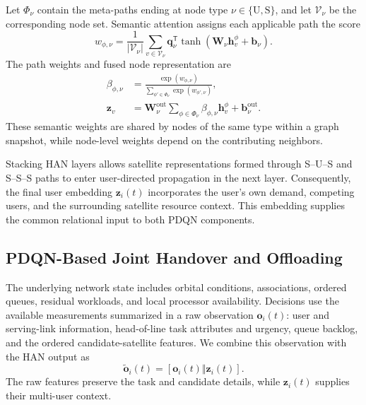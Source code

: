 Let $\Phi_\nu$ contain the meta-paths ending at node type
$\nu\in\{\mathrm U,\mathrm S\}$, and let $\mathcal{V}_\nu$
be the corresponding node set. Semantic attention assigns
each applicable path the score
\begin{equation}
w_{\phi,\nu}
=
\frac{1}{|\mathcal{V}_\nu|}
\sum_{v\in\mathcal{V}_\nu}
\mathbf{q}_\nu^{\mathsf T}
\tanh\left(\mathbf{W}_\nu\mathbf{h}_v^\phi
+\mathbf{b}_\nu\right).
\label{eq:han_semantic_score}
\end{equation}
The path weights and fused node representation are
\begin{equation}
\begin{aligned}
\beta_{\phi,\nu}
&=
\frac{\exp(w_{\phi,\nu})}
{\sum_{\phi'\in\Phi_\nu}\exp(w_{\phi',\nu})},\\
\mathbf{z}_v
&=
\mathbf{W}^{\mathrm{out}}_\nu
\sum_{\phi\in\Phi_\nu}
\beta_{\phi,\nu}\mathbf{h}_v^\phi
+\mathbf{b}^{\mathrm{out}}_\nu.
\end{aligned}
\label{eq:han_semantic_fusion}
\end{equation}
These semantic weights are shared by nodes of the same type
within a graph snapshot, while node-level weights depend
on the contributing neighbors.

Stacking HAN layers allows satellite representations formed
through S--U--S and S--S--S paths to enter user-directed
propagation in the next layer. Consequently, the final
user embedding $\mathbf{z}_i(t)$ incorporates the user's
own demand, competing users, and the surrounding satellite
resource context. This embedding supplies the common
relational input to both PDQN components.

\subsection{PDQN-Based Joint Handover and Offloading}
\label{subsec:pdqn_joint_control}

The underlying network state includes orbital conditions,
associations, ordered queues, residual workloads, and local
processor availability. Decisions use the available
measurements summarized in a raw observation
$\mathbf{o}_i(t)$: user and serving-link information,
head-of-line task attributes and urgency, queue backlog,
and the ordered candidate-satellite features.
We combine this observation with the HAN output as
\begin{equation}
\widetilde{\mathbf{o}}_i(t)
=
\left[\mathbf{o}_i(t)\Vert\mathbf{z}_i(t)\right].
\label{eq:fused_pdqn_observation}
\end{equation}
The raw features preserve the task and candidate details,
while $\mathbf{z}_i(t)$ supplies their multi-user context.

